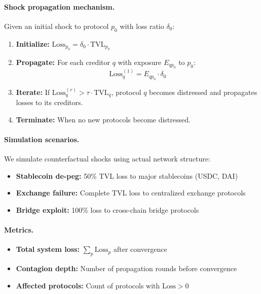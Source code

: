 \paragraph{Shock propagation mechanism.}
Given an initial shock to protocol $p_0$ with loss ratio $\delta_0$:
\begin{enumerate}
  \item \textbf{Initialize:} $\text{Loss}_{p_0} = \delta_0 \cdot \text{TVL}_{p_0}$
  \item \textbf{Propagate:} For each creditor $q$ with exposure $E_{qp_0}$ to $p_0$:
  \begin{equation}
    \text{Loss}_q^{(1)} = E_{qp_0} \cdot \delta_0
  \end{equation}
  \item \textbf{Iterate:} If $\text{Loss}_q^{(r)} > \tau \cdot \text{TVL}_q$, protocol $q$ becomes distressed and propagates losses to its creditors.
  \item \textbf{Terminate:} When no new protocols become distressed.
\end{enumerate}

\paragraph{Simulation scenarios.}
We simulate counterfactual shocks using actual network structure:
\begin{itemize}
  \item \textbf{Stablecoin de-peg:} 50\% TVL loss to major stablecoins (USDC, DAI)
  \item \textbf{Exchange failure:} Complete TVL loss to centralized exchange protocols
  \item \textbf{Bridge exploit:} 100\% loss to cross-chain bridge protocols
\end{itemize}

\paragraph{Metrics.}
\begin{itemize}
  \item \textbf{Total system loss:} $\sum_p \text{Loss}_p$ after convergence
  \item \textbf{Contagion depth:} Number of propagation rounds before convergence
  \item \textbf{Affected protocols:} Count of protocols with $\text{Loss} > 0$
\end{itemize}

